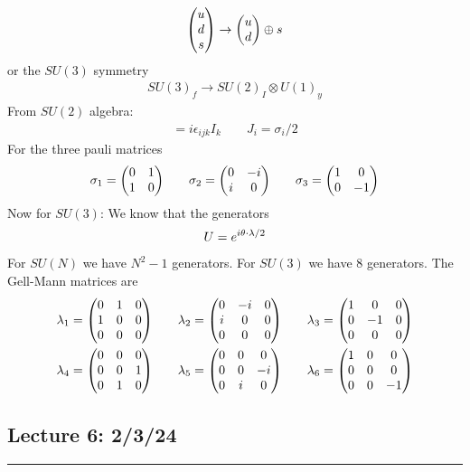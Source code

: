 \documentclass[../main.tex]{subfiles}
\begin{document}
\begin{align*}
    \mqty(u \\ d \\ s) \to \mqty(u \\ d) \oplus s
\end{align*}
or the $SU(3)$ symmetry
\begin{align*}
    SU(3)_f \to SU(2)_I \otimes U(1)_y
\end{align*}
From $SU(2)$ algebra:
\begin{align*}
    [J_i, J_j] = i \epsilon_{ijk} I_k \qquad J_i = \sigma_i / 2
\end{align*}
For the three pauli matrices
\begin{align*}
    \sigma_1 = \mqty(0 & 1 \\ 1 & 0) \qquad 
    \sigma_2 = \mqty(0 & -i \\ i & 0) \qquad
    \sigma_3 = \mqty(1 & 0 \\ 0 & -1)
\end{align*}
Now for $SU(3)$: We know that the generators
\begin{align*}
    U = e^{i \vb{\theta} \cdot \vb{\lambda}/2}
\end{align*}
For $SU(N)$ we have $N^2 - 1$ generators. For $SU(3)$ we have 8 generators. The Gell-Mann matrices
are 
\begin{align*}
    \lambda_1 &= \mqty(0 & 1 & 0 \\ 1 & 0 & 0 \\ 0 & 0 & 0) \qquad
    \lambda_2 = \mqty(0 & -i & 0 \\ i & 0 & 0 \\ 0 & 0 & 0) \qquad
    \lambda_3 = \mqty(1 & 0 & 0 \\ 0 & -1 & 0 \\ 0 & 0 & 0) \\
    \lambda_4 &= \mqty(0 & 0 & 0 \\ 0 & 0 & 1 \\ 0 & 1 & 0) \qquad
    \lambda_5 = \mqty(0 & 0 & 0 \\ 0 & 0 & -i \\ 0 & i & 0) \qquad
    \lambda_6 = \mqty(1 & 0 & 0 \\ 0 & 0 & 0 \\ 0 & 0 & -1)
\end{align*}

\newpage
\subsection*{Lecture 6: \hfill  2/3/24}
\hrule \vspace{10px}
\end{document}

